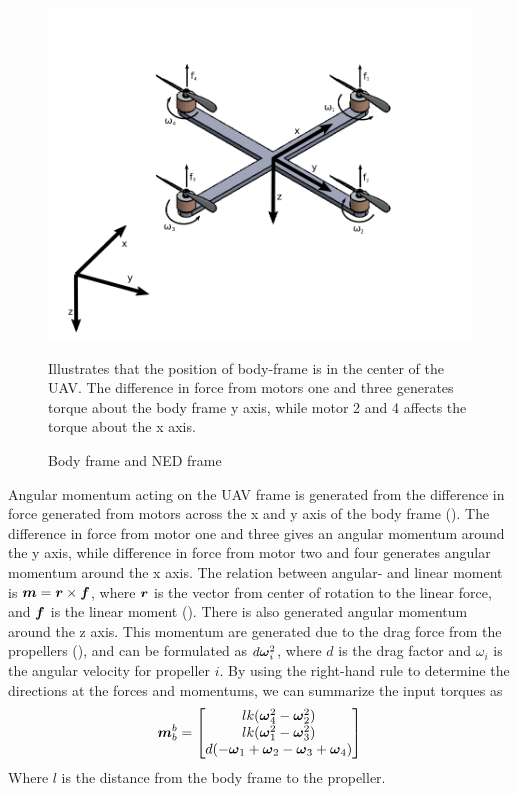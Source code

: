\begin{figure}[htbp]
  \centering
  \includegraphics[width=.8\textwidth]{img/simpleQuadRef}
  \caption{Body frame and NED frame}{Illustrates that the position of body-frame is in the center of the UAV. The difference in force from motors one and three generates torque about the body frame y axis, while motor 2 and 4 affects the torque about the x axis. }
  \label{fig:quadRef}
\end{figure}

Angular momentum acting on the UAV frame is generated from the difference in force generated from motors across the x and y axis of the body frame (\cite{lozano2013unmanned}). The difference in force from 
motor one and three gives an angular momentum around the y axis, while difference in force from motor two and four generates angular momentum around the x axis. The relation between angular- and linear moment 
is $\boldsymbol{m}=\boldsymbol{r}\times \boldsymbol{f}$, where $\boldsymbol{r}$ is the vector from center of rotation to the linear force, and $\boldsymbol{f}$ is the linear moment (\cite{egeland2002modeling}). There is also generated 
angular momentum around the z axis. This momentum are generated due to the drag force from the propellers (\cite{nicolai2001fundamentals}), and can be formulated as $d\boldsymbol{\omega}^2_i$, where $d$ is the drag factor and
$\omega_i$ is the angular velocity for propeller $i$. By using the right-hand rule to determine the directions at the forces and momentums, we can summarize the input torques as
\renewcommand*{\arraystretch}{1}
\begin{equation}
  \boldsymbol{m}_b^b=
  \begin{bmatrix}
    lk(\boldsymbol{\omega}_4^2-\boldsymbol{\omega}_2^2)\\
    lk(\boldsymbol{\omega}_1^2-\boldsymbol{\omega}_3^2)\\
    d(-\boldsymbol{\omega}_1+\boldsymbol{\omega}_2-\boldsymbol{\omega}_3+\boldsymbol{\omega}_4)
  \end{bmatrix}
\end{equation}
Where $l$ is the distance from the body frame to the propeller.

